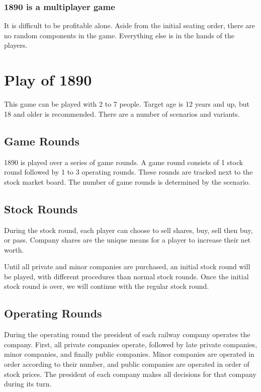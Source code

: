 \documentclass{article}
\begin{document}
\begin{CJK}{UTF8}{min}
\begin{multicols}{2}
\subsubsection*{1890 is a multiplayer game}
It is difficult to be profitable alone. Aside from the initial seating
order, there are no random components in the game. Everything else is
in the hands of the players.

\section{Play of 1890}
This game can be played with 2 to 7 people. Target age is 12 years
and up, but 18 and older is recommended. There are a number of
scenarios and variants.

\subsection{Game Rounds}
1890 is played over a series of game rounds. A game round consists of
1 stock round followed by 1 to 3 operating rounds. These rounds are
tracked next to the stock market board. The number of game rounds is
determined by the scenario.

\subsection{Stock Rounds}

During the stock round, each player can choose to sell
shares, buy, sell then buy, or pass. Company shares are the unique
means for a player to increase their net worth.

Until all private and minor companies are purchased, an initial stock
round will be played, with different procedures than normal stock
rounds. Once the initial stock round is over, we will continue with
the regular stock round.

\subsection{Operating Rounds}
During the operating round the president of each railway company
operates the company. First, all private companies operate, followed
by late private companies, minor companies, and finally public
companies. Minor companies are operated in order according to their
number, and public companies are operated in order of stock
prices. The president of each company makes all decisions for that
company during its turn.


\end{multicols}
\end{CJK}
\end{document}
